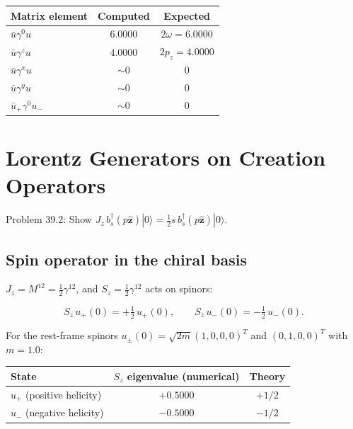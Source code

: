 \begin{center}
\begin{tabular}{l|c|c}
Matrix element & Computed & Expected \\ \hline
$\bar u\gamma^0 u$ & $6.0000$ & $2\omega=6.0000$ \\
$\bar u\gamma^z u$  & $4.0000$ & $2p_z=4.0000$ \\
$\bar u\gamma^x u$  & $\sim 0$ & $0$ \\
$\bar u\gamma^y u$  & $\sim 0$ & $0$ \\
$\bar u_+\gamma^0 u_-$ & $\sim 0$ & $0$ \\
\end{tabular}
\end{center}


\section{Lorentz Generators on Creation Operators}

Problem 39.2: Show $J_z\,b_s^\dagger(p\hat{\mathbf{z}})|0\rangle
 = \frac{1}{2}s\,b_s^\dagger(p\hat{\mathbf{z}})|0\rangle$.

\subsection{Spin operator in the chiral basis}

$J_z = M^{12} = \frac{1}{2}\gamma^{12}$, and $S_z = \frac{1}{2}\gamma^{12}$ acts on spinors:
\begin{mdframed}[backgroundcolor=blue!5]
\begin{equation}
S_z\,u_+(0) = +\tfrac{1}{2}\,u_+(0), \qquad
S_z\,u_-(0) = -\tfrac{1}{2}\,u_-(0) .
\end{equation}
\end{mdframed}

For the rest-frame spinors $u_\pm(0)=\sqrt{2m}(1,0,0,0)^T$ and $(0,1,0,0)^T$ with $m=1.0$:
\begin{center}
\begin{tabular}{l|c|c}
State & $S_z$ eigenvalue (numerical) & Theory \\ \hline
$u_+$ (positive helicity) & $+0.5000$ & $+1/2$ \\
$u_-$ (negative helicity) & $-0.5000$ & $-1/2$ \\
\end{tabular}
\end{center}

